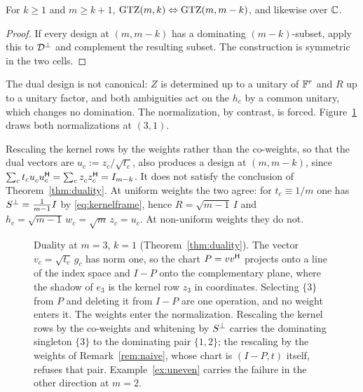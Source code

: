 \begin{corollary}[Lean]\label{cor:dualcell}
For $k\ge1$ and $m\ge k+1$,
$\mathrm{GTZ}(m,k)\Leftrightarrow\mathrm{GTZ}(m,m-k)$, and likewise over $\mathbb{C}$.
\end{corollary}

\begin{proof}
If every design at $(m,m-k)$ has a dominating $(m-k)$-subset, apply this
to $\mathcal{D}^{\perp}$ and complement the resulting subset.  The
construction is symmetric in the two cells.
\end{proof}

The dual design is not canonical: $Z$ is determined up to a unitary of
$\mathbb{F}^{r}$ and $R$ up to a unitary factor, and both ambiguities act on the
$h_c$ by a common unitary, which changes no domination.  The
normalization, by contrast, is forced.  Figure~\ref{fig:duality} draws
both normalizations at $(3,1)$.

\begin{remark}\label{rem:naive}
Rescaling the kernel rows by the weights rather than the co-weights, so
that the dual vectors are $u_c:=z_c/\sqrt{t_c}$, also
produces a design at $(m,m-k)$, since $\sum_ct_cu_c^{\vphantom{\mathsf{H}}}u_c\adj
=\sum_cz_c^{\vphantom{\mathsf{H}}}z_c\adj=I_{m-k}$.  It does not satisfy the
conclusion of Theorem~\ref{thm:duality}.  At uniform weights the two
agree: for $t_c\equiv1/m$ one has $S^{\perp}=\frac{1}{m-1}I$ by
\eqref{eq:kernelframe}, hence $R=\sqrt{m-1}\,I$ and
$h_c=\sqrt{m-1}\,w_c=\sqrt{m}\,z_c=u_c$.  At non-uniform weights they do
not.
\end{remark}

\begin{figure}[ht]
  \centering
  
  \caption{Duality at $m=3$, $k=1$ (Theorem~\ref{thm:duality}).  The vector
  $v_c=\sqrt{t_c}\,g_c$ has norm one, so the chart $P=vv^{\mathsf{H}}$ projects onto a
  line of the index space and $I-P$ onto the complementary plane, where the
  shadow of $e_3$ is the kernel row $z_3$ in coordinates.  Selecting $\{3\}$
  from $P$ and deleting it from $I-P$ are one operation, and no weight enters
  it.  The weights enter the normalization.  Rescaling the kernel rows by the
  co-weights and whitening by $S^{\perp}$ carries the dominating singleton
  $\{3\}$ to the dominating pair $\{1,2\}$; the rescaling by the weights of
  Remark~\ref{rem:naive}, whose chart is $(I-P,t)$ itself, refuses that pair.
  Example~\ref{ex:uneven} carries the failure in the other direction at
  $m=2$.}
  \label{fig:duality}
\end{figure}



